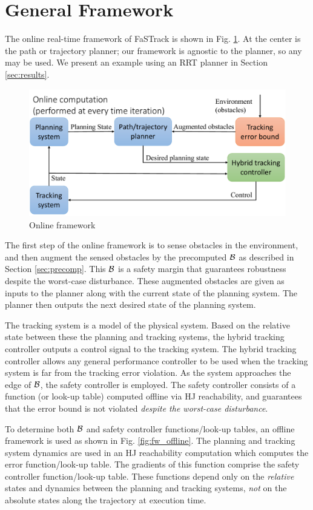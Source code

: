 \section{General Framework \label{sec:framework}}
The online real-time framework of FaSTrack is shown in Fig. \ref{fig:fw_online}. At the center is the path or trajectory planner; our framework is agnostic to the planner, so any may be used. We present an example using an RRT planner in Section \ref{sec:results}.
\begin{figure}[]
  \centering
	\includegraphics[width=0.8\columnwidth]{fig/framework_online}
	\caption{Online framework}
	\label{fig:fw_online}
	\vspace{-.1in}
\end{figure}

The first step of the online framework is to sense obstacles in the environment, and then augment the sensed obstacles by the precomputed $\mathcal B$ as described in Section \ref{sec:precomp}. This $\mathcal B$ is a safety margin that guarantees robustness despite the worst-case disturbance. These augmented obstacles are given as inputs to the planner along with the current state of the planning system. The planner then outputs the next desired state of the planning system. 

The tracking system is a model of the physical system. Based on the relative state between these the planning and tracking systems, the hybrid tracking controller outputs a control signal to the tracking system. The hybrid tracking controller allows any general performance controller to be used when the tracking system is far from the tracking error violation. As the system approaches the edge of $\mathcal B$, the safety controller is employed. The safety controller consists of a function (or look-up table) computed offline via HJ reachability, and guarantees that the error bound is not violated \textit{despite the worst-case disturbance}.

To determine both $\mathcal B$ and safety controller functions/look-up tables, an offline framework is used as shown in Fig. \ref{fig:fw_offline}. The planning and tracking system dynamics are used in an HJ reachability computation which computes the error function/look-up table. The gradients of this function comprise the safety controller function/look-up table. These functions depend only on the \textit{relative} states and dynamics between the planning and tracking systems, \textit{not} on the absolute states along the trajectory at execution time.

